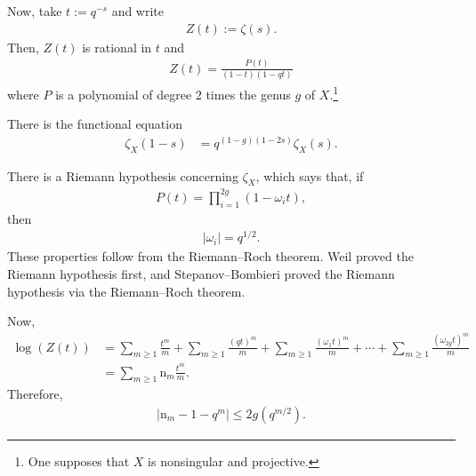 \documentclass [11 pt, oneside] {article}
\begin{document}
Now, take $t:= q^{-s}$ and write
\begin{align*}
	Z(t) := \zeta (s).
\end{align*}
Then, $Z(t)$ is rational in $t$ and
\begin{align*}
	Z(t) =  \frac{P(t)}{(1-t) (1-qt)}
\end{align*}
where $P$ is a polynomial of degree $2$ times the genus $g$ of $X$.\footnote{One supposes that $X$ is nonsingular and projective.}

There is the functional equation
\begin{align*}
	\zeta_X(1-s)&= q^{(1-g) (1-2s)}\zeta_X (s).
\end{align*}

There is a Riemann hypothesis concerning $\zeta_X$, which says that, if 
\begin{align*}
	P(t) = \prod_{i=1}^{2g}  (1-\omega_it),
\end{align*}
then
\begin{align*}
	\left\lvert \omega_i \right\rvert = q^{1/2}.
\end{align*}
These properties follow from the Riemann--Roch theorem. Weil proved the Riemann hypothesis first, and Stepanov--Bombieri proved the Riemann hypothesis via the Riemann--Roch theorem.

Now,
\begin{align*}
	\log(Z(t)) &=
	   \sum_{m\ge 1}^{} \frac{t^m}{m} + \sum_{m\ge 1}^{}  \frac{(qt) ^m}{m} + \sum_{m\ge 1}^{} \frac{(\omega_1t)^m}{m} + \cdots + \sum_{m\ge 1}^{} \frac{(\omega_{2g}t)^m}{m}\\
		   &= \sum_{m\ge 1}^{} \mathup{n}_m\frac{t^m}{m}.
\end{align*}
Therefore,
\begin{align*}
	\left\lvert \mathup{n}_m -1 - q^m \right\rvert \le 2g(q^{m/2}).
\end{align*}
\end{document}
